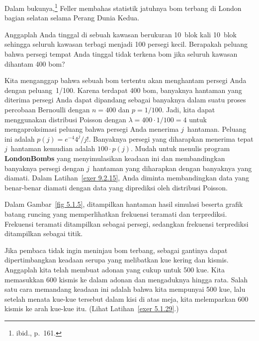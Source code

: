 \begin{example}\label{exam 5.5} Dalam bukunya,\footnote{ibid., p.~161.}
Feller membahas statistik jatuhnya bom terbang di
London bagian selatan selama Perang Dunia Kedua.
\par
Anggaplah Anda tinggal di sebuah kawasan berukuran 10~blok kali 10~blok sehingga seluruh
kawasan terbagi menjadi 100 persegi kecil. Berapakah peluang bahwa persegi tempat Anda
tinggal tidak terkena bom jika seluruh kawasan dihantam 400 bom?
\par
Kita menganggap bahwa sebuah bom tertentu akan menghantam persegi Anda dengan
peluang~1/100. Karena terdapat 400 bom, banyaknya hantaman yang diterima persegi Anda
dapat dipandang sebagai banyaknya  dalam suatu proses percobaan
Bernoulli dengan $n = 400$ dan $p = 1/100$. Jadi, kita dapat menggunakan distribusi
Poisson dengan $\lambda = 400 \cdot 1/100 = 4$ untuk mengaproksimasi peluang bahwa
persegi Anda menerima $j$~hantaman. Peluang ini adalah $p(j) = e^{-4} 4^j/j!$.
Banyaknya persegi yang diharapkan menerima tepat $j$~hantaman kemudian adalah
$100 \cdot p(j)$. Mudah untuk menulis program {\bf LondonBombs} yang menyimulasikan
keadaan ini dan membandingkan banyaknya persegi dengan $j$~hantaman yang diharapkan
dengan banyaknya yang diamati. Dalam Latihan~\ref{exer 9.2.15}, Anda diminta
membandingkan data yang benar-benar diamati dengan data yang diprediksi oleh distribusi
Poisson.
\par
Dalam Gambar~\ref{fig 5.1.5}, ditampilkan hantaman hasil simulasi beserta grafik batang
runcing yang memperlihatkan frekuensi teramati dan terprediksi. Frekuensi teramati
ditampilkan sebagai persegi, sedangkan frekuensi terprediksi ditampilkan sebagai titik.
\end{example} 
Jika pembaca tidak ingin meninjau bom terbang, sebagai gantinya dapat dipertimbangkan
keadaan serupa yang melibatkan kue kering dan kismis. Anggaplah kita telah membuat adonan
yang cukup untuk 500 kue. Kita memasukkan 600 kismis ke dalam adonan dan mengaduknya
hingga rata. Salah satu cara memandang keadaan ini adalah bahwa kita mempunyai 500 kue,
lalu setelah menata kue-kue tersebut dalam kisi di atas meja, kita melemparkan 600
kismis ke arah kue-kue itu. (Lihat Latihan~\ref{exer 5.1.29}.)
